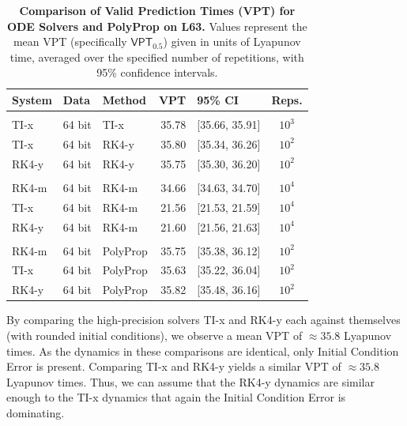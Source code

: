 \documentclass{article}
\newcommand{\vpt}[1]{\mathsf{VPT}_{#1}}
\begin{document}
\begin{table}[b!]
	\centering
\begin{center}
\fontsize{8.0pt}{10pt}\selectfont
{}\selectfont
\renewcommand{\arraystretch}{1.05}
\setlength{\tabcolsep}{0.5em}
\begin{tabular}{lllrlc}
\toprule
System & Data & Method & VPT & 95\% CI & Reps. \\ 
\midrule\addlinespace[2.5pt]
\multicolumn{6}{l}{Extreme Precision} \\[2.5pt] 
\midrule\addlinespace[2.5pt]
TI-x & 64 bit & TI-x & 35.78 & [35.66, 35.91] & $10^{3}$ \\ 
TI-x & 64 bit & RK4-y & 35.80 & [35.34, 36.26] & $10^{2}$ \\ 
RK4-y & 64 bit & RK4-y & 35.75 & [35.30, 36.20] & $10^{2}$ \\ 
\midrule\addlinespace[2.5pt]
\multicolumn{6}{l}{High Precision} \\[2.5pt] 
\midrule\addlinespace[2.5pt]
RK4-m & 64 bit & RK4-m & 34.66 & [34.63, 34.70] & $10^{4}$ \\ 
TI-x & 64 bit & RK4-m & 21.56 & [21.53, 21.59] & $10^{4}$ \\ 
RK4-y & 64 bit & RK4-m & 21.60 & [21.56, 21.63] & $10^{4}$ \\ 
\midrule\addlinespace[2.5pt]
\multicolumn{6}{l}{PolyProp} \\[2.5pt] 
\midrule\addlinespace[2.5pt]
RK4-m & 64 bit & PolyProp & 35.75 & [35.38, 36.12] & $10^{2}$ \\ 
TI-x & 64 bit & PolyProp & 35.63 & [35.22, 36.04] & $10^{2}$ \\ 
RK4-y & 64 bit & PolyProp & 35.82 & [35.48, 36.16] & $10^{2}$ \\ 
\bottomrule
\end{tabular}
\end{center}


	\caption{\textbf{Comparison of Valid Prediction Times (VPT) for ODE Solvers and PolyProp on L63.} Values represent the mean VPT (specifically $\vpt{0.5}$) given in units of Lyapunov time, averaged over the specified number of repetitions, with 95\% confidence intervals.}\label{tbl:xprec}
\end{table}

By comparing the high-precision solvers TI-x and RK4-y each against themselves (with rounded initial conditions), we observe a mean VPT of $\approx 35.8$ Lyapunov times. 
As the dynamics in these comparisons are identical, only Initial Condition Error is present. 
Comparing TI-x and RK4-y yields a similar VPT of $\approx 35.8$ Lyapunov times. Thus, we can assume that the RK4-y dynamics are similar enough to the TI-x dynamics that again the Initial Condition Error is dominating. 
\end{document}
